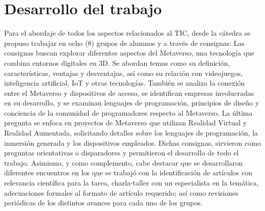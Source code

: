\documentclass[a4paper,10pt]{article}
\begin{document}
		\section{Desarrollo del trabajo}
	{\normalsize Para el abordaje de todos los aspectos relacionados al TIC, desde la cátedra se propuso trabajar en ocho (8) grupos de alumnos y a través de consignas:
		Las consignas buscan explorar diferentes aspectos del Metaverso, una tecnología que combina entornos digitales en 3D. Se abordan temas como su definición, características, ventajas y desventajas, así como su relación con videojuegos, inteligencia artificial, IoT y otras tecnologías. También se analiza la conexión entre el Metaverso y dispositivos de acceso, se identifican empresas involucradas en su desarrollo, y se examinan lenguajes de programación, principios de diseño y conciencia de la comunidad de programadores respecto al Metaverso. La última pregunta se enfoca en proyectos de Metaverso que utilizan Realidad Virtual y Realidad Aumentada, solicitando detalles sobre los lenguajes de programación, la inmersión generada y los dispositivos empleados.
		Dichas consignas, sirvieron como preguntas orientativas o disparadores y permitieron el desarrollo de todo el trabajo. Asimismo, y como complemento, cabe destacar que se desarrollaron diferentes encuentros en los que se trabajó con la identificación de artículos con relevancia científica para la tarea, charla-taller con un especialista en la temática, adecuaciones formales al formato de artículo requerido; así como revisiones periódicas de los distintos avances para cada uno de los grupos.}
\end{document}
